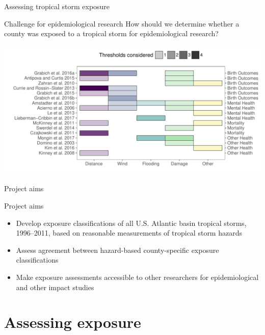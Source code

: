 \documentclass[ignorenonframetext,]{beamer}
\begin{document}
\begin{frame}{Assessing tropical storm exposure}

\begin{block}{Challenge for epidemiological research}
How should we determine whether a county was exposed to a tropical storm for epidemiological research?
\end{block}

\vspace{-0.3cm}

\pause

\begin{center}\includegraphics[height=0.77\textheight]{previous_exposure_metrics} \end{center}

\end{frame}

\begin{frame}{Project aims}

\begin{block}{Project aims}
\begin{itemize}
  \item Develop exposure classifications of all U.S. Atlantic basin tropical storms, 1996--2011, based on reasonable measurements of tropical storm hazards
  \item Assess agreement between hazard-based county-specific exposure classifications
  \item Make exposure assessments accessible to other researchers for epidemiological and other impact studies 
\end{itemize}
\end{block}

\end{frame}

\section{Assessing exposure}\label{assessing-exposure}
\end{document}
